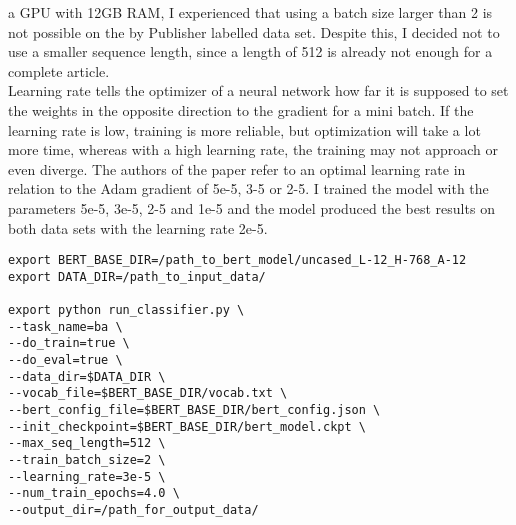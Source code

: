\documentclass[a4paper, 11pt,titlepage,oneside,openany]{book}
\begin{document}
a GPU with 12GB RAM, I  experienced that using a batch size larger than 2 is not possible on the by Publisher labelled data set. Despite this, I decided not to use a smaller sequence length, since a length of 512 is already not enough for a complete article. \\
\indent Learning rate tells the optimizer of a neural network how far it is supposed to set the weights in the opposite direction to the gradient for a mini batch. If the learning rate is low, training is more reliable, but  optimization will take a lot more time, whereas with a high learning rate, the training may not approach or even diverge. The authors of the paper refer to an optimal learning rate in relation to the Adam gradient \cite{adam} of 5e-5, 3-5 or 2-5. I trained the model with the parameters 5e-5, 3e-5, 2-5 and 1e-5 and the model produced the best results on both data sets with the learning rate 2e-5. \\
\begin{lstlisting}[caption={Example: Calling \textit{run\_classifier} with the required flags},captionpos=b, frame = single]
export BERT_BASE_DIR=/path_to_bert_model/uncased_L-12_H-768_A-12
export DATA_DIR=/path_to_input_data/

export python run_classifier.py \
--task_name=ba \
--do_train=true \
--do_eval=true \
--data_dir=$DATA_DIR \
--vocab_file=$BERT_BASE_DIR/vocab.txt \
--bert_config_file=$BERT_BASE_DIR/bert_config.json \
--init_checkpoint=$BERT_BASE_DIR/bert_model.ckpt \
--max_seq_length=512 \
--train_batch_size=2 \
--learning_rate=3e-5 \
--num_train_epochs=4.0 \
--output_dir=/path_for_output_data/
\end{lstlisting}
\end{document}
